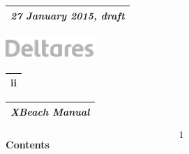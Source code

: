 \documentclass{article}
\begin{document}
\noindent 

\noindent 

\noindent 

\begin{tabular}{|p{2.6in}|} \hline 
\textit{27 January 2015, draft} \\ \hline 
\end{tabular}

\includegraphics*[width=1.34in, height=0.38in, keepaspectratio=false]{image5}

\noindent 

\begin{tabular}{|p{0.4in}|} \hline 
ii \\ \hline 
\end{tabular}



\noindent 

\begin{tabular}{|p{3.5in}|} \hline 
\textit{XBeach Manual} \\ \hline 
\end{tabular}


\[1\] \textbf{Contents}
\end{document}
